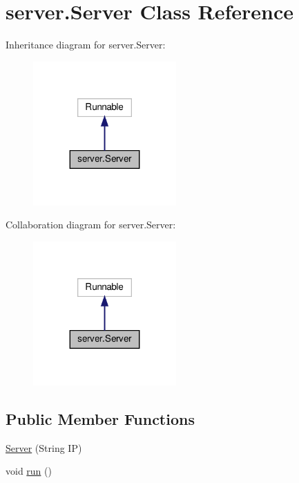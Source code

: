 \hypertarget{classserver_1_1_server}{}\section{server.\+Server Class Reference}
\label{classserver_1_1_server}


Inheritance diagram for server.\+Server\+:
\nopagebreak
\begin{figure}[H]
\begin{center}
\leavevmode
\includegraphics[width=155pt]{classserver_1_1_server__inherit__graph}
\end{center}
\end{figure}


Collaboration diagram for server.\+Server\+:
\nopagebreak
\begin{figure}[H]
\begin{center}
\leavevmode
\includegraphics[width=155pt]{classserver_1_1_server__coll__graph}
\end{center}
\end{figure}
\subsection*{Public Member Functions}
\begin{DoxyCompactItemize}
\item 
\hyperlink{classserver_1_1_server_a0cd54beb5f4b2177f7161d2d7d4b6285}{Server} (String IP)
\item 
void \hyperlink{classserver_1_1_server_a803f3b2a096f160a4070a55085f98c2e}{run} ()
\end{DoxyCompactItemize}


